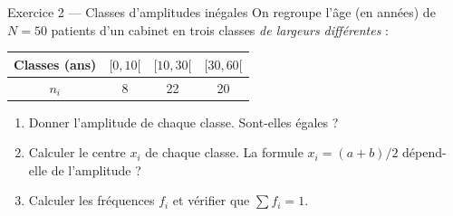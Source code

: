 \documentclass[11pt,a4paper]{article}
\begin{document}
\begin{exobox}{Exercice 2 — Classes d'amplitudes inégales}
On regroupe l'âge (en années) de $N=50$ patients d'un cabinet en trois classes \emph{de largeurs
différentes} :
\begin{center}
\renewcommand{\arraystretch}{1.2}
\begin{tabular}{|c|c|c|c|}
\hline
Classes (ans) & $[0,10[$ & $[10,30[$ & $[30,60[$ \\\hline
$n_i$ & 8 & 22 & 20 \\\hline
\end{tabular}
\end{center}
\begin{enumerate}[label=\textbf{(\alph*)}]
  \item Donner l'amplitude de chaque classe. Sont-elles égales ?
  \item Calculer le centre $x_i$ de chaque classe. La formule $x_i=(a+b)/2$ dépend-elle de l'amplitude ?
  \item Calculer les fréquences $f_i$ et vérifier que $\sum f_i=1$.
\end{enumerate}
\end{exobox}
\end{document}
